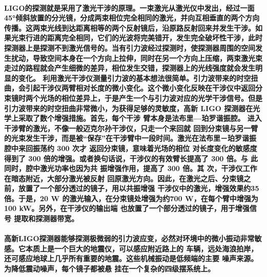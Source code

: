 \documentclass{article}
\begin{document}
\paragraph{LIGO的探测就是采用了激光干涉的原理。一束激光从激光仪中发出，经过一面45°倾斜放置的分光镜，分成两束相位完全相同的激光，并向互相垂直的两个方向传播。这两束光线到达距离相等的两个反射镜后，沿原路反射回来并发生干涉。如果光束行进的距离完全相同，它们的光波将完美错开，发生完全破坏性干涉，此时探测器上是探测不到激光信号的。当有引力波经过探测时，使探测器周围的空间发生扰动，导致空间本身在一个方向上拉伸，同时在另一个方向上压缩，两束激光束走过的路程就会产生细微的差异，相位发生交错，探测器上的光线强度就会发生明显的变化。
利用激光干涉仪测量引力波的基本想法很简单。引力波带来的时空扭曲，会引起干涉仪两臂相对长度的微小变化。这个微小变化反映在干涉仪中返回分束镜时两个光场的相位差异上，于是产生一个与引力波对应的光学干涉信号。但是引力波带来的时空扭曲非常微小，为获得足够的灵敏度，高新 LIGO 探测器在光学上采取了数个增强措施。首先，每个干涉 臂本身是法布里—珀罗谐振腔。 进入干涉臂的激光，不像一般迈克尔孙干涉仪，只走一个来回就 回到分束镜与另一臂的光束发生干涉，而是被“保存”在干涉臂中一段时间。激光在法布里－珀罗谐振腔中来回振荡约 300 次才 返回分束镜，意味着光场的相位 对长度变化的敏感度得到了 300 倍的增强。或者换句话说，干涉仪的有效臂长提高了 300 倍。与 此同时，腔中激光功率也因为共 振增强作用，提高了 300 倍。其 次，干涉仪工作在暗态附近，大部分激光被反射 回原激光方向。因此，在激光之后、分束镜之前，放置了一个部分透过的镜子，用以共振增强 干涉仪中的激光，增强效果约35倍。于是，20 W 的激光输入，在分束镜处增强为约700 W，在每个臂中增强为100 kW。另外，在干涉仪的输出端 也放置了一个部分透过的镜子，用于增强信号 提取和探测器带宽。}
\paragraph{高新LIGO探测器能够探测极微弱的引力波应变，必然对环境中的微小振动非常敏感。它本质上是一个巨大的地震仪，可以感应附近路上的 车辆，远处海浪拍岸，还可感应地球上几乎所有重要的地震。这些机械振动是低频端的主要 噪声来源。为降低震动噪声，每个镜子都被悬 挂在一个复杂的四级摆系统上。}
\end{document}

